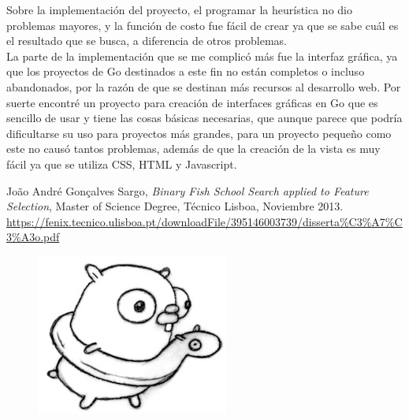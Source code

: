 \documentclass[12pt]{article}
\begin{document}
Sobre la implementación del proyecto, el programar la heurística no dio problemas mayores, y la función de costo fue fácil de crear ya que se sabe cuál es el resultado que se busca, a diferencia de otros problemas. \\

La parte de la implementación que se me complicó más fue la interfaz gráfica, ya que los proyectos de Go destinados a este fin no están completos o incluso abandonados, por la razón de que se destinan más recursos al desarrollo web. Por suerte encontré un proyecto para creación de interfaces gráficas en Go que es sencillo de usar y tiene las cosas básicas necesarias, que aunque parece que podría dificultarse su uso para proyectos más grandes, para un proyecto pequeño como este no causó tantos problemas, además de que la creación de la vista es muy fácil ya que se utiliza CSS, HTML y Javascript.

\begin{thebibliography}{99}

  João André Gonçalves Sargo,
  \emph{Binary Fish School Search applied to Feature Selection},
  Master of Science Degree, Técnico Lisboa,
  Noviembre 2013. \\
  \url{https://fenix.tecnico.ulisboa.pt/downloadFile/395146003739/disserta%C3%A7%C3%A3o.pdf}
  \end{thebibliography}

  
\begin{figure}[b]
  \includegraphics[scale=4, right]{media/gopherswim.jpg} \\
\end{figure}
\end{document}

